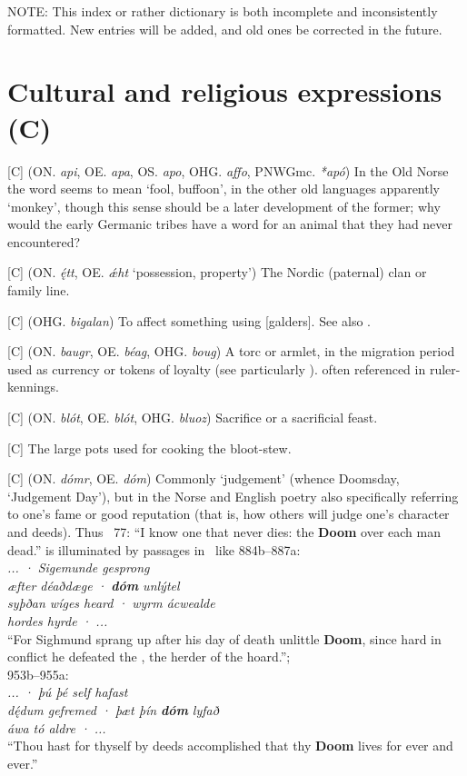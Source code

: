 
NOTE: This index or rather dictionary is both incomplete and inconsistently formatted. New entries will be added, and old ones be corrected in the future.

\section{Cultural and religious expressions (C)}
\begin{itemize}

[C] (ON. \emph{api}, OE. \emph{apa}, OS. \emph{apo}, OHG. \emph{affo}, PNWGmc. \emph{*apó})
  In the Old Norse the word seems to mean ‘fool, buffoon’, in the other old languages apparently ‘monkey’, though this sense should be a later development of the former; why would the early Germanic tribes have a word for an animal that they had never encountered?

[C] (ON. \emph{ę́tt}, OE. \emph{ǽht} ‘possession, property’)
  The Nordic (paternal) clan or family line.

[C] (OHG. \emph{bigalan})
  To affect something using [galders]. See also .

[C] (ON. \emph{baugr}, OE. \emph{béag}, OHG. \emph{boug})
  A torc or armlet, in the migration period used as currency or tokens of loyalty (see particularly \Hildebrandslied). often referenced in ruler-kennings.

[C] (ON. \emph{blót}, OE. \emph{blót}, OHG. \emph{bluoz})
  Sacrifice or a sacrificial feast.

[C]
  The large pots used for cooking the bloot-stew.

[C] (ON. \emph{dómr}, OE. \emph{dóm})
  Commonly ‘judgement’ (whence Doomsday, ‘Judgement Day’), but in the Norse and English poetry also specifically referring to one’s fame or good reputation (that is, how others will judge one’s character and deeds). Thus \Havamal\ 77: “I know one that never dies: the \textbf{Doom} over each man dead.” is illuminated by passages in \Beowulf\ like 884b–887a: \\ \emph{... · Sigemunde gesprong \\ æfter déaðdæge · \textbf{dóm} unlýtel \\ syþðan wíges heard · wyrm ácwealde \\ hordes hyrde · ...} \\ “For Sighmund sprang up after his day of death unlittle \textbf{Doom}, since hard in conflict he defeated the , the herder of the hoard.”; \\ 953b–955a: \\ \emph{... · þú þé self hafast \\ dę́dum gefremed · þæt þín \textbf{dóm} lyfað \\ áwa tó aldre · ...} \\ “Thou hast for thyself by deeds accomplished that thy \textbf{Doom} lives for ever and ever.”


\end{itemize}

